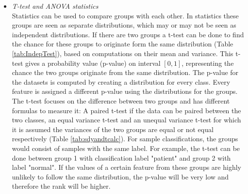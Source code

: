 \documentclass[10pt,a4paper]{article}
\begin{document}
	\begin{itemize}
	\item \textit{T-test and ANOVA statistics} \\ 
	Statistics can be used to compare groups with each other. In statistics these groups are seen as separate distributions, which may or may not be seen as independent distributions. If there are two groups a t-test can be done to find the chance for these groups to originate form the same distribution\cite{heiberger2004statistical} (Table \ref{tab:IndepTest}), based on computations on their mean and variance. This t-test gives a probability value (p-value) on interval $[0,1]$, representing the chance the two groups originate from the same distribution. The p-value for the datasets is computed by creating a distribution for every class. Every feature is assigned a different p-value using the distributions for the groups.
	The t-test focuses on the difference between two groups and has different formulas to measure it: A paired t-test if the data can be paired between the two classes, an equal variance t-test and an unequal variance t-test for which it is assumed the variances of the two groups are equal or not equal respectively\cite{heiberger2004statistical} (Table \ref{tab:sdyandtcalc}).
	For sample classifications, the groups would consist of samples with the same label. For example, the t-test can be done between group 1 with classification label "patient" and group 2 with label "normal". If the values of a certain feature from these groups are highly unlikely to follow the same distribution, the p-value will be very low and therefore the rank will be higher.
	

\end{itemize}
\end{document}
